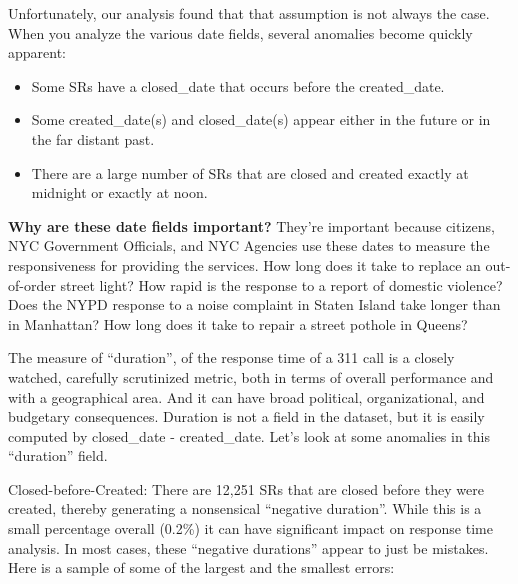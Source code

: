 \documentclass[12pt, titlepage]{article}
\begin{document}
Unfortunately, our analysis found that that assumption is not always the case. When you analyze the various date fields, several
anomalies become quickly apparent:

	\begin{itemize}
		    \item Some SRs have a closed\_date that occurs before the created\_date.
		    \item Some created\_date(s) and closed\_date(s) appear either in the future or in the far distant past.
		    \item There are a large number of SRs that are closed and created exactly at midnight or exactly at noon. 
	\end{itemize}

\textbf{Why are these date fields important?} They're important because citizens, NYC Government Officials, and NYC Agencies use these dates
to measure the responsiveness for providing the services. How long does it take to replace an out-of-order street light?
How rapid is the response to a report of domestic violence? Does the NYPD response to a noise complaint in Staten Island take
longer than in Manhattan? How long does it take to repair a street pothole in Queens? 

The measure of ``duration'', of the response time of a 311 call is a closely watched, carefully scrutinized metric, 
both in terms of overall performance and with a geographical area. And it can have broad political, organizational,
and budgetary consequences. Duration is not a field in the dataset, but it is easily computed by closed\_date - created\_date.
Let's look at some anomalies in this ``duration'' field.

Closed-before-Created:  There are 12,251 SRs that are closed before they were created, thereby generating a nonsensical 
``negative duration''. While this is a small percentage overall (0.2\%) it can have significant impact on response time analysis.
In most cases, these ``negative durations'' appear to just be mistakes. Here is a sample of some of the largest and the
smallest errors:
\end{document}
